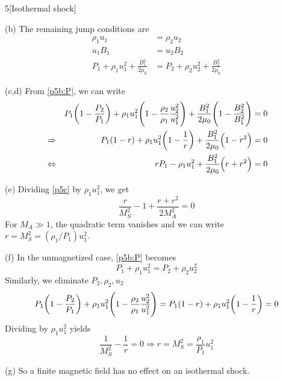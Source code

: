 \documentclass[12pt]{article}
\begin{document}
\begin{problem}{5}[Isothermal shock]
\begin{solution}
(b) The remaining jump conditions are
\begin{subequations}
    \begin{align}
        \rho_1u_1&=\rho_2u_2\\
        u_1B_1&=u_2B_2\\
        P_1+\rho_1u_1^2+\frac{B_1^2}{2\mu_0}&=P_2+\rho_2u_2^2+\frac{B_2^2}{2\mu_0}\label{p5b:P}
    \end{align} 
\end{subequations}

(c,d) From \eqref{p5b:P}, we can write
\begin{align}\label{p5c}
    &&P_1\qty(1-\frac{P_2}{P_1})+\rho_1u_1^2\qty(1-\frac{\rho_2}{\rho_1}\frac{u_2^2}{u_1^2})+\frac{B_1^2}{2\mu_0}\qty(1-\frac{B_2^2}{B_1^2})&=0\notag\\
    &\Rightarrow&
    P_1(1-r)+\rho_1u_1^2\qty(1-\frac1r)+\frac{B_1^2}{2\mu_0}\qty(1-r^2)&=0\notag\\
    &\Leftrightarrow&
    rP_1-\rho_1u_1^2+\frac{B_1^2}{2\mu_0}\qty(r+r^2)&=0
\end{align}

(e) Dividing \eqref{p5c} by $\rho_1u_1^2$, we get
\begin{equation}
    \frac{r}{M_S^2}-1+\frac{r+r^2}{2M_A^2}=0 
\end{equation}
For $M_A\gg 1$, the quadratic term vanishes and we can write
$r=M_S^2=(\rho_1/P_1)u_1^2$.

(f) In the unmagnetized case, \eqref{p5b:P} becomes
\begin{equation}
    P_1+\rho_1u_1^2=P_2+\rho_2u_2^2 
\end{equation}
Similarly, we eliminate $P_2,\rho_2,u_2$
\begin{equation}
    P_1\qty(1-\frac{P_2}{P_1})+\rho_1u_1^2\qty(1-\frac{\rho_2}{\rho_1}\frac{u_2^2}{u_1^2})=P_1(1-r)+\rho_1u_1^2\qty(1-\frac1r)=0 
\end{equation}
Dividing by $\rho_1u_1^2$ yields
\begin{equation}
    \frac{1}{M_S^2}-\frac1r=0\Rightarrow r=M_S^2=\frac{\rho_1}{P_1}u_1^2
\end{equation}

(g) So a finite magnetic field has no effect on an isothermal shock.
\end{solution}
\end{problem}
\end{document}
